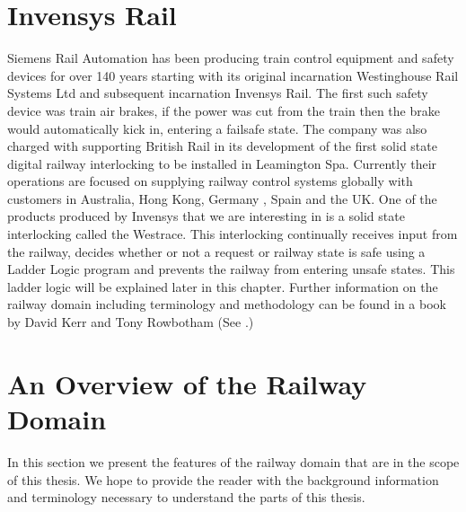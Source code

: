 \section{Invensys Rail}

Siemens Rail Automation \cite{Siemens} has been producing train control equipment and safety devices for over 140 years starting with its original incarnation Westinghouse Rail Systems Ltd and subsequent incarnation Invensys Rail. 
The first such safety device was train air brakes, if the power was cut from the train then the brake would automatically kick in, entering a failsafe state. The company was also charged with supporting British Rail in its development of the first solid state digital railway interlocking to be installed in Leamington Spa. Currently their operations are focused on supplying railway control systems globally with customers in Australia, Hong Kong, Germany , Spain and the UK. One of the products produced by Invensys that we are interesting in is  a solid state interlocking called the Westrace. This interlocking continually receives input from the railway, decides whether or not a request or railway state is safe using a Ladder Logic program and prevents the railway from entering unsafe states. This ladder logic will be explained later in this chapter. Further information on the railway domain including terminology and methodology can be found in a book by David Kerr and Tony Rowbotham (See \cite{KR01}.)
\begin{comment}

Originally they produced air brakes for trains, these had a
failsafe state such that if the power was cut the brakes would automatically stop the train.
Later on in the company's development they provided support to British Rail
when the first solid state digital railway interlocking was installed in
Leamington Spa. Today they supply railway control equipment to companies based
around the globe, including companies based in Australia, Hong Kong,
Germany, Spain and the UK. This project is mainly concerned with one of the
solid state railway interlockings Invensys produces called the Westrace. The
Westrace railway interlocking continuously runs a ladder logic program which
prevents the railway control systems from entering a dangerous state. Ladder
logic will be explained in a later chapter.
David Kerr and Tony Rowbotham  produced a book that explains the
terminology and methodology used in the railway industry and by
Invensys (See \cite{KR01}).  
\end{comment}
\section{An Overview of the Railway Domain} 
In this section we present the features of the railway domain that are in
the scope of this thesis. We hope to provide the reader with the background
information and terminology necessary to understand the parts of this thesis.


